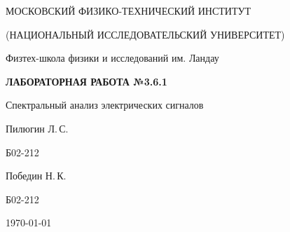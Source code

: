 
\begin{center}
    {
        \MakeUppercase{Московский физико-технический институт}

        \MakeUppercase{(Национальный исследовательский университет)}
    }

    {
        Физтех-школа физики и исследований им. Ландау
    }
    
    \vspace{200pt}
    {
        \Huge
        \bfseries
        \MakeUppercase{Лабораторная работа №3.6.1}
    }

    \vspace{24pt}
    {
        \Large
        Спектральный анализ электрических сигналов
    }

    \vspace{24pt}
    {
        \large
        Пилюгин Л.\,С.

        Б02-212
    }

    {
        \large
        Победин Н.\,К.

        Б02-212
    }

    \vspace{2pt}
    {
        \large
        \today
    }
\end{center}

\newpage
{}
\setcounter{page}{2}
